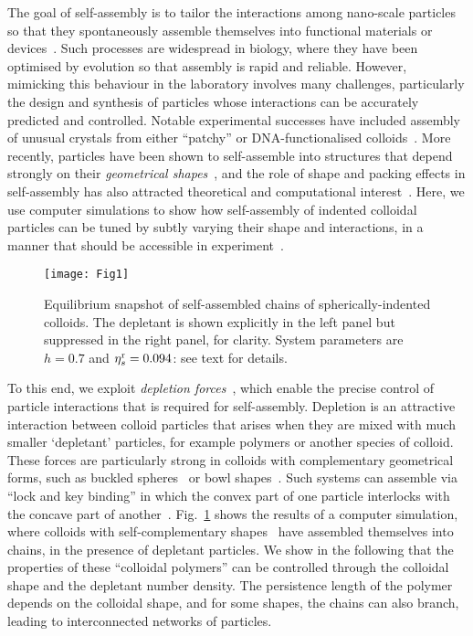 \documentclass[10pt,onside,singlecolumn]{article}
\newcommand{\figurewidth}{0.95\textwidth}
\begin{document}
The goal of self-assembly is to tailor the interactions among
nano-scale particles so that they spontaneously assemble themselves
into functional materials or
devices~\cite{whitesides:2002,Glotzer2007}.  Such processes are
widespread in biology, where they have been optimised by evolution so
that assembly is rapid and reliable.  However, mimicking this
behaviour in the laboratory involves many challenges, particularly the
design and synthesis of particles whose interactions can be accurately
predicted and controlled.  Notable experimental successes have
included assembly of unusual crystals from either ``patchy'' or
DNA-functionalised colloids~\cite{Nykpanchuk08,Chen11}.  More
recently, particles have been shown to self-assemble into structures
that depend strongly on their \emph{geometrical
shapes}~\cite{Sacanna:2010ys,marechal2010,Rossi11,Henzie12,octapod12,sacanna13, Kraft12},
and the role of shape and packing effects in self-assembly has also
attracted theoretical and computational
interest~\cite{Damasceno12,Odriozola08-13,Torquato09,Henzie12,octapod12,Kraft12,marechal2010,
Ni12,Damasceno12-nano,Haji13,Gantapara13,Anders-arxiv13}.
Here, we use computer simulations to show how self-assembly of
indented colloidal particles can be tuned by subtly varying their
shape and interactions, in a manner that should be accessible in
experiment~\cite{Sacanna:2010ys}.

\begin{figure} 
  \texttt{[image: Fig1]}
  \caption{Equilibrium snapshot of self-assembled chains of spherically-indented colloids.  
  The depletant is shown explicitly in the left panel but suppressed in the right panel, for clarity.
  System parameters are $h=0.7$ and $\eta^{\rm r}_s=0.094$: see text for details. }
  \label{fig:snapshot0.3}
\end{figure}

To this end, we exploit {\em depletion
  forces}~\cite{Lekkerkerker:2011}, which enable the precise control
of particle interactions that is required for self-assembly.
Depletion is an attractive interaction between colloid particles that
arises when they are mixed with much smaller `depletant' particles,
for example polymers or another species of colloid.  These forces are
particularly strong in colloids with complementary geometrical forms,
such as buckled spheres~\cite{Sacanna:2010ys} or bowl
shapes~\cite{marechal2010}.  Such systems can assemble via ``lock and
key binding'' in which the convex part of one particle interlocks with
the concave part of
another~\cite{Konig2008,Sacanna:2010ys,Odriozola08-13}.
Fig.~\ref{fig:snapshot0.3} shows the results of a computer simulation,
where colloids with self-complementary shapes~\cite{Sacanna:2010ys} have assembled
themselves into chains, in the presence of depletant particles.  We
show in the following that the properties of these ``colloidal
polymers'' can be controlled through the colloidal shape and the
depletant number density.  The persistence length of the polymer
depends on the colloidal shape, and for some shapes, the chains can
also branch, leading to interconnected networks of particles.
\end{document}
